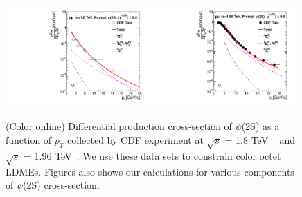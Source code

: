 \documentclass[aps,prc,preprint,superscriptaddress,showpacs,showkeys,amsmath]{revtex4-1}
\begin{document}
\begin{figure}
\includegraphics[width=0.49\textwidth]{Figures/Psi2S/Psi2S_CDF_180TeV.pdf}
\includegraphics[width=0.49\textwidth]{Figures/Psi2S/Psi2S_CDF_196TeV.pdf}
\caption{(Color online) Differential production cross-section of $\psi$(2S) as
 a function of $p_{T}$ collected by CDF experiment at $\sqrt{s}$ = 1.8 TeV
 ~\cite{Abe:1997jz} and $\sqrt{s}$ = 1.96 TeV~\cite{Acosta:2004yw}. We use these 
 data sets to constrain color octet LDMEs. Figures also shows our calculations 
 for various components of $\psi$(2S) cross-section.}
\label{Fig:LDMEPsi2SCDF}
\end{figure}
\end{document}
